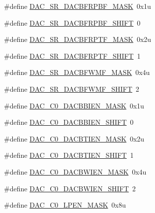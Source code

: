 \begin{DoxyCompactItemize}
\item 
\#define \hyperlink{group___d_a_c___register___masks_ga5af56fd75a9c5b74fe07c8f303d452aa}{D\+A\+C\+\_\+\+S\+R\+\_\+\+D\+A\+C\+B\+F\+R\+P\+B\+F\+\_\+\+M\+A\+SK}~0x1u
\item 
\#define \hyperlink{group___d_a_c___register___masks_ga5581f254327f3d4e57b161b5c771fb1c}{D\+A\+C\+\_\+\+S\+R\+\_\+\+D\+A\+C\+B\+F\+R\+P\+B\+F\+\_\+\+S\+H\+I\+FT}~0
\item 
\#define \hyperlink{group___d_a_c___register___masks_ga662e824677c1a7a94ddd36e90f3d37d5}{D\+A\+C\+\_\+\+S\+R\+\_\+\+D\+A\+C\+B\+F\+R\+P\+T\+F\+\_\+\+M\+A\+SK}~0x2u
\item 
\#define \hyperlink{group___d_a_c___register___masks_gad1df4286616f5369388e865f5f821ae9}{D\+A\+C\+\_\+\+S\+R\+\_\+\+D\+A\+C\+B\+F\+R\+P\+T\+F\+\_\+\+S\+H\+I\+FT}~1
\item 
\#define \hyperlink{group___d_a_c___register___masks_ga612ec408d340d5011ff4326eda077ae3}{D\+A\+C\+\_\+\+S\+R\+\_\+\+D\+A\+C\+B\+F\+W\+M\+F\+\_\+\+M\+A\+SK}~0x4u
\item 
\#define \hyperlink{group___d_a_c___register___masks_ga01791b2f636fa97d33fa49d410ca8b44}{D\+A\+C\+\_\+\+S\+R\+\_\+\+D\+A\+C\+B\+F\+W\+M\+F\+\_\+\+S\+H\+I\+FT}~2
\item 
\#define \hyperlink{group___d_a_c___register___masks_gadc37ad99d42f4b9d0e26ce03f2ac79ad}{D\+A\+C\+\_\+\+C0\+\_\+\+D\+A\+C\+B\+B\+I\+E\+N\+\_\+\+M\+A\+SK}~0x1u
\item 
\#define \hyperlink{group___d_a_c___register___masks_ga956aa991114a1bb71a891e66d7092d1e}{D\+A\+C\+\_\+\+C0\+\_\+\+D\+A\+C\+B\+B\+I\+E\+N\+\_\+\+S\+H\+I\+FT}~0
\item 
\#define \hyperlink{group___d_a_c___register___masks_gad8a60a2fa6211ff08bba4b9648fb8daa}{D\+A\+C\+\_\+\+C0\+\_\+\+D\+A\+C\+B\+T\+I\+E\+N\+\_\+\+M\+A\+SK}~0x2u
\item 
\#define \hyperlink{group___d_a_c___register___masks_ga1f8eb9a96341365badba1280bed49e05}{D\+A\+C\+\_\+\+C0\+\_\+\+D\+A\+C\+B\+T\+I\+E\+N\+\_\+\+S\+H\+I\+FT}~1
\item 
\#define \hyperlink{group___d_a_c___register___masks_gaedff72359a12b93e4b61a57a0613d3cb}{D\+A\+C\+\_\+\+C0\+\_\+\+D\+A\+C\+B\+W\+I\+E\+N\+\_\+\+M\+A\+SK}~0x4u
\item 
\#define \hyperlink{group___d_a_c___register___masks_ga2b61f6fc85e9dc9d7c736055b47fadd1}{D\+A\+C\+\_\+\+C0\+\_\+\+D\+A\+C\+B\+W\+I\+E\+N\+\_\+\+S\+H\+I\+FT}~2
\item 
\#define \hyperlink{group___d_a_c___register___masks_ga54a04b9ae84c5a4f8977ae2e1a889717}{D\+A\+C\+\_\+\+C0\+\_\+\+L\+P\+E\+N\+\_\+\+M\+A\+SK}~0x8u

\end{DoxyCompactItemize}
